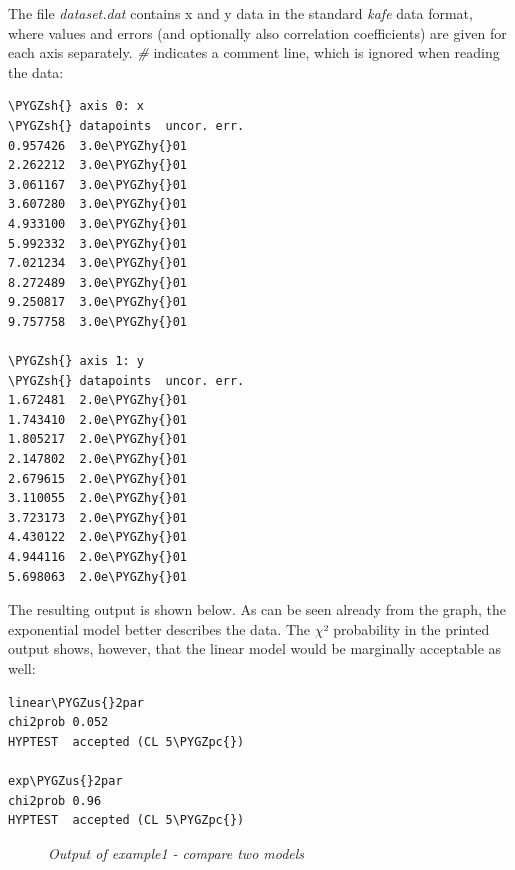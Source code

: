 \documentclass[a4paper,10pt,english]{sphinxmanual}
\def\PYGZus{\char`\_}
\def\PYGZsh{\char`\#}
\def\PYGZpc{\char`\%}
\def\PYGZhy{\char`\-}
\begin{document}
The file \emph{dataset.dat} contains x and y data in the standard \emph{kafe} data
format, where values and errors (and optionally also correlation coefficients)
are given for each axis separately. \emph{\#} indicates a comment line, which
is ignored when reading the data:

\begin{Verbatim}[commandchars=\\\{\}]
\PYGZsh{} axis 0: x
\PYGZsh{} datapoints  uncor. err.
0.957426  3.0e\PYGZhy{}01
2.262212  3.0e\PYGZhy{}01
3.061167  3.0e\PYGZhy{}01
3.607280  3.0e\PYGZhy{}01
4.933100  3.0e\PYGZhy{}01
5.992332  3.0e\PYGZhy{}01
7.021234  3.0e\PYGZhy{}01
8.272489  3.0e\PYGZhy{}01
9.250817  3.0e\PYGZhy{}01
9.757758  3.0e\PYGZhy{}01

\PYGZsh{} axis 1: y
\PYGZsh{} datapoints  uncor. err.
1.672481  2.0e\PYGZhy{}01
1.743410  2.0e\PYGZhy{}01
1.805217  2.0e\PYGZhy{}01
2.147802  2.0e\PYGZhy{}01
2.679615  2.0e\PYGZhy{}01
3.110055  2.0e\PYGZhy{}01
3.723173  2.0e\PYGZhy{}01
4.430122  2.0e\PYGZhy{}01
4.944116  2.0e\PYGZhy{}01
5.698063  2.0e\PYGZhy{}01
\end{Verbatim}

The resulting output is shown below. As can be seen already
from the graph, the exponential model better describes the
data. The \(\chi\)² probability in the printed output shows, however,
that the linear model would be marginally acceptable as well:

\begin{Verbatim}[commandchars=\\\{\}]
linear\PYGZus{}2par
chi2prob 0.052
HYPTEST  accepted (CL 5\PYGZpc{})

exp\PYGZus{}2par
chi2prob 0.96
HYPTEST  accepted (CL 5\PYGZpc{})
\end{Verbatim}
\begin{figure}[htbp]
\centering
\capstart

\caption{\emph{Output of example1 - compare two models}}\end{figure}
\end{document}
